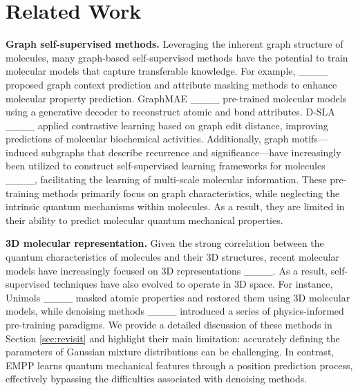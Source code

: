 \section{Related Work}
\vspace{-1em}
\textbf{Graph self-supervised methods.} Leveraging the inherent graph structure of molecules, many graph-based self-supervised methods have the potential to train molecular models that capture transferable knowledge. For example, ____ proposed graph context prediction and attribute masking methods to enhance molecular property prediction. GraphMAE ____ pre-trained molecular models using a generative decoder to reconstruct atomic and bond attributes. D-SLA ____ applied contrastive learning based on graph edit distance, improving predictions of molecular biochemical activities. Additionally, graph motifs—induced subgraphs that describe recurrence and significance—have increasingly been utilized to construct self-supervised learning frameworks for molecules ____, facilitating the learning of multi-scale molecular information. These pre-training methods primarily focus on graph characteristics, while neglecting the intrinsic quantum mechanisms within molecules. As a result, they are limited in their ability to predict molecular quantum mechanical properties. 



\textbf{3D molecular representation.} Given the strong correlation between the quantum characteristics of molecules and their 3D structures, recent molecular models have increasingly focused on 3D representations ____. As a result, self-supervised techniques have also evolved to operate in 3D space. For instance, Unimols ____ masked atomic properties and restored them using 3D molecular models, while denoising methods ____ introduced a series of physics-informed pre-training paradigms. We provide a detailed discussion of these methods in Section \ref{sec:revisit} and highlight their main limitation: accurately defining the parameters of Gaussian mixture distributions can be challenging. In contrast, EMPP learns quantum mechanical features through a position prediction process, effectively bypassing the difficulties associated with denoising methods.


